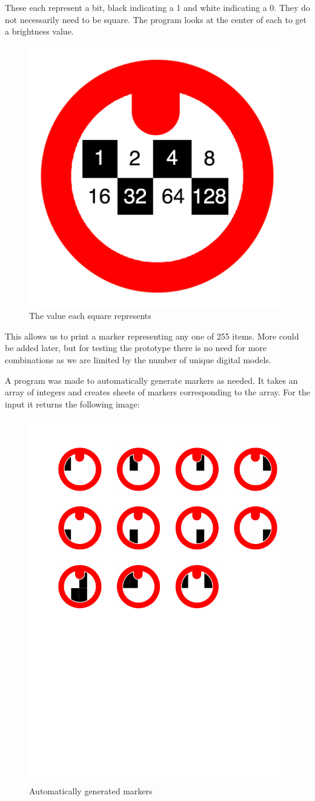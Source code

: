 These each represent a bit, black indicating a 1 and white indicating a 0. They do not necessarily need to be square. The program looks at the center of each to get a brightness value.

\begin{figure}[H]
	\centering
	\includegraphics[width=0.3\linewidth]{figure/Analysis/circleexample}
	\caption{The value
		 each square represents}
	\label{fig:circle}
\end{figure}

This allows us to print a marker representing any one of 255 items. More could be added later, but for testing the prototype there is no need for more combinations as we are limited by the number of unique digital models.

A program was made to automatically generate markers as needed. It takes an array of integers and creates sheets of markers corresponding to the array. For the input  it returns the following image:

\begin{figure}[H]
	\centering
	\includegraphics[width=0.6\linewidth]{figure/Analysis/result}
	\caption{Automatically generated markers}
	\label{fig:result}
\end{figure}


